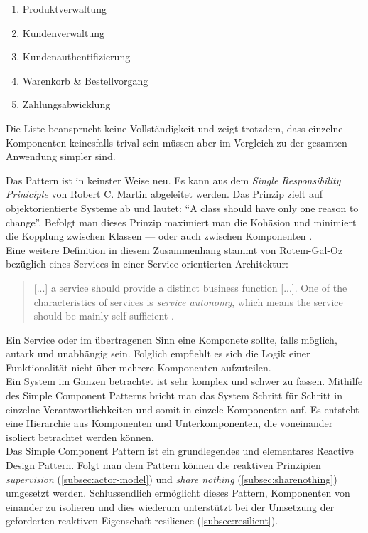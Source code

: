 \begin{enumerate}
\item Produktverwaltung
\item Kundenverwaltung
\item Kundenauthentifizierung
\item Warenkorb \& Bestellvorgang
\item Zahlungsabwicklung
\end{enumerate}

Die Liste beansprucht keine Vollständigkeit und zeigt trotzdem, dass einzelne Komponenten keinesfalls trival sein müssen aber im Vergleich zu der gesamten Anwendung simpler sind.

\pagebreak

Das Pattern ist in keinster Weise neu. Es kann aus dem \textit{Single Responsibility Priniciple} von Robert C. Martin abgeleitet werden. Das Prinzip zielt auf objektorientierte Systeme ab und lautet: \enquote{A class should have only one reason to change}. Befolgt man dieses Prinzip maximiert man die Kohäsion und minimiert die Kopplung zwischen Klassen --- oder auch zwischen Komponenten \cite[S.~185]{kuhn_reactive_2015} \cite{martin_single_2014}.\\
Eine weitere Definition in diesem Zusammenhang stammt von Rotem-Gal-Oz bezüglich eines Services in einer Service-orientierten Architektur:

\begin{quotation}
[...] a service should provide a distinct business function [...]. One of the characteristics of services is \textit{service autonomy}, which means the service should be mainly self-sufficient \cite[S.~7]{rotem_soa_2012}.
\end{quotation}

Ein Service oder im übertragenen Sinn eine Komponete sollte, falls möglich, autark und unabhängig sein. Folglich empfiehlt es sich die Logik einer Funktionalität nicht über mehrere Komponenten aufzuteilen.\\

Ein System im Ganzen betrachtet ist sehr komplex und schwer zu fassen. Mithilfe des Simple Component Patterns bricht man das System Schritt für Schritt in einzelne Verantwortlichkeiten und somit in einzele Komponenten auf. Es entsteht eine Hierarchie aus Komponenten und Unterkomponenten, die voneinander isoliert betrachtet werden können.\\
Das Simple Component Pattern ist ein grundlegendes und elementares Reactive Design Pattern. Folgt man dem Pattern können die reaktiven Prinzipien \textit{supervision} (\ref{subsec:actor-model}) und \textit{share nothing} (\ref{subsec:sharenothing}) umgesetzt werden. Schlussendlich ermöglicht dieses Pattern, Komponenten von einander zu isolieren und dies wiederum unterstützt bei der Umsetzung der geforderten reaktiven Eigenschaft resilience (\ref{subsec:resilient}).

